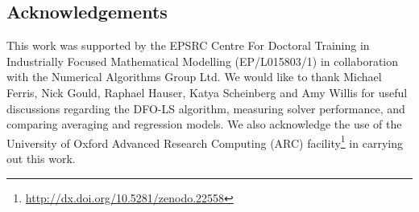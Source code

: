 \subsection{Acknowledgements}
This work was supported by the EPSRC Centre For Doctoral Training in Industrially Focused Mathematical Modelling (EP/L015803/1) in collaboration with the Numerical Algorithms Group Ltd.
We would like to thank Michael Ferris, Nick Gould, Raphael Hauser, Katya Scheinberg and Amy Willis for useful discussions regarding the DFO-LS algorithm, measuring solver performance, and comparing averaging and regression models.
We also acknowledge the use of the University of Oxford Advanced Research Computing (ARC) facility\footnote{\:\url{http://dx.doi.org/10.5281/zenodo.22558}} in carrying out this work. 

